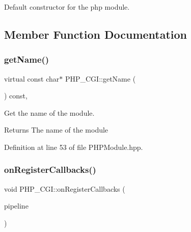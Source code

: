 Default constructor for the php module. 



\subsection{Member Function Documentation}
\mbox{\label{class_p_h_p___c_g_i_a6446691803801b4100f18bcd53899237}} 
\subsubsection{\texorpdfstring{get\+Name()}{getName()}}
{\footnotesize\ttfamily virtual const char$\ast$ P\+H\+P\+\_\+\+C\+G\+I\+::get\+Name (\begin{DoxyParamCaption}\item[{void}]{ }\end{DoxyParamCaption}) const\hspace{0.3cm}{\ttfamily [inline]}, {\ttfamily [virtual]}}



Get the name of the module. 

\begin{DoxyReturn}{Returns}
The name of the module 
\end{DoxyReturn}


Definition at line 53 of file P\+H\+P\+Module.\+hpp.

\mbox{\label{class_p_h_p___c_g_i_a5f85735822d4cb288b34182d43b2d059}} 
\subsubsection{\texorpdfstring{on\+Register\+Callbacks()}{onRegisterCallbacks()}}
{\footnotesize\ttfamily void P\+H\+P\+\_\+\+C\+G\+I\+::on\+Register\+Callbacks (\begin{DoxyParamCaption}\item[{o\+Z\+::\+Pipeline \&}]{pipeline }\end{DoxyParamCaption})\hspace{0.3cm}{\ttfamily [virtual]}}



